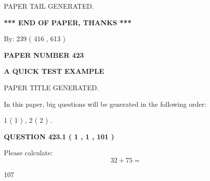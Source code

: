 \documentclass[12pt]{article}
\begin{document}
\vspace{2.0in} PAPER TAIL GENERATED.
   
   
   
   
\vspace{1.0in} 
{\textbf{\large{ *** END OF PAPER, THANKS *** }}} 
   
   
\hspace{1.0in} By: 
 239 ( 416 ,  613 )
   
   
   
   
\newpage 
\setcounter{page}{ 
   423001 } 
   
   
   
   
 {\textbf{ \Large{ PAPER NUMBER  423  }}}
   
   
\vspace{0.2in}
   
   
   
   
   
   
   
   
 \vspace{0.2in}
{\LARGE {\textbf{ A QUICK TEST EXAMPLE}}}
   
   
 PAPER TITLE GENERATED.
   
   
   
\vspace{0.2in}
   
In this paper, big questions will be generated in the following order: 
   
   
   1 ( 1 )
 ,
   2 ( 2 )
 .
  
\vspace{0.2in}
  
{\textbf{\Large{QUESTION
423.1 
 ( 1 , 1 , 101 )
}}}
  
  
 
Please calculate:
\begin{equation}
32 +  %
75 = \nonumber
\end{equation}
 
 
 
\noindent{}
 
 

107
 
 
\noindent{}
 
 

 
 
\end{document}
